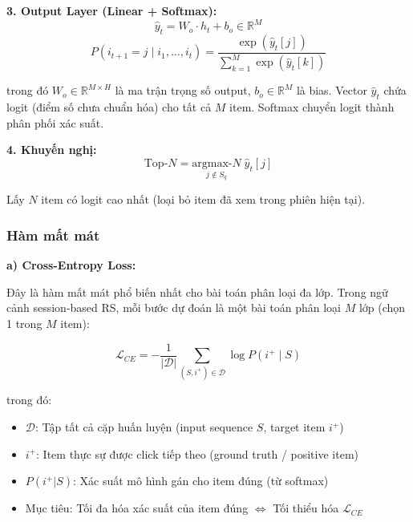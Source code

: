 \documentclass[12pt, a4paper]{article}
\begin{document}
\textbf{3. Output Layer (Linear + Softmax):}
\begin{equation}
    \hat{y}_t = W_o \cdot h_t + b_o \in \mathbb{R}^M
    \label{eq:output_logits}
\end{equation}
\begin{equation}
    P(i_{t+1} = j \;|\; i_1, \ldots, i_t) = \frac{\exp(\hat{y}_t[j])}{\sum_{k=1}^{M} \exp(\hat{y}_t[k])}
    \label{eq:softmax}
\end{equation}

trong đó $W_o \in \mathbb{R}^{M \times H}$ là ma trận trọng số output, $b_o \in \mathbb{R}^M$ là bias. Vector $\hat{y}_t$ chứa logit (điểm số chưa chuẩn hóa) cho tất cả $M$ item. Softmax chuyển logit thành phân phối xác suất.

\textbf{4. Khuyến nghị:}
\begin{equation}
    \text{Top-}N = \underset{j \notin S_q}{\text{argmax-}N} \; \hat{y}_t[j]
    \label{eq:gru4rec_topn}
\end{equation}

Lấy $N$ item có logit cao nhất (loại bỏ item đã xem trong phiên hiện tại).

\subsubsection{Hàm mất mát}

\textbf{a) Cross-Entropy Loss:}

Đây là hàm mất mát phổ biến nhất cho bài toán phân loại đa lớp. Trong ngữ cảnh session-based RS, mỗi bước dự đoán là một bài toán phân loại $M$ lớp (chọn 1 trong $M$ item):

\begin{equation}
\boxed{
    \mathcal{L}_{CE} = -\frac{1}{|\mathcal{D}|} \sum_{(S, i^+) \in \mathcal{D}} \log P(i^+ \;|\; S)
}
\label{eq:ce_loss}
\end{equation}

trong đó:
\begin{itemize}
    \item $\mathcal{D}$: Tập tất cả cặp huấn luyện (input sequence $S$, target item $i^+$)
    \item $i^+$: Item thực sự được click tiếp theo (ground truth / positive item)
    \item $P(i^+ | S)$: Xác suất mô hình gán cho item đúng (từ softmax)
    \item Mục tiêu: Tối đa hóa xác suất của item đúng $\Leftrightarrow$ Tối thiểu hóa $\mathcal{L}_{CE}$
\end{itemize}
\end{document}
